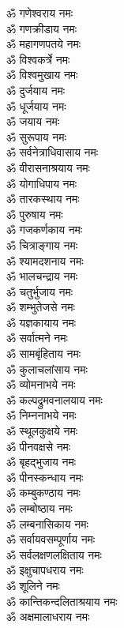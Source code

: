 \begin{multicols}{2}
\begin{flushleft}
ॐ गणेश्वराय नमः\\
ॐ गणक्रीडाय नमः\\
ॐ महागणपतये नमः\\
ॐ विश्वकर्त्रे नमः\\
ॐ विश्वमुखाय नमः\\
ॐ दुर्जयाय नमः\\
ॐ धूर्जयाय नमः\\
ॐ जयाय नमः\\
ॐ सुरूपाय नमः\\
ॐ सर्वनेत्राधिवासाय नमः\hfill{}\\
ॐ वीरासनाश्रयाय नमः\\
ॐ योगाधिपाय नमः\\
ॐ तारकस्थाय नमः\\
ॐ पुरुषाय नमः\\
ॐ गजकर्णकाय नमः\\
ॐ चित्राङ्गाय नमः\\
ॐ श्यामदशनाय नमः\\
ॐ भालचन्द्राय नमः\\
ॐ चतुर्भुजाय नमः\\
ॐ शम्भुतेजसे नमः\hfill{}\\
ॐ यज्ञकायाय नमः\\
ॐ सर्वात्मने नमः\\
ॐ सामबृंहिताय नमः\\
ॐ कुलाचलांसाय नमः\\
ॐ व्योमनाभये नमः\\
ॐ कल्पद्रुमवनालयाय नमः\\
ॐ निम्ननाभये नमः\\
ॐ स्थूलकुक्षये नमः\\
ॐ पीनवक्षसे नमः\\
ॐ बृहद्भुजाय नमः\hfill{}\\
ॐ पीनस्कन्धाय नमः\\
ॐ कम्बुकण्ठाय नमः\\
ॐ लम्बोष्ठाय नमः\\
ॐ लम्बनासिकाय नमः\\
ॐ सर्वायवसम्पूर्णाय नमः\\
ॐ सर्वलक्षणलक्षिताय नमः\\
ॐ इक्षुचापधराय नमः\\
ॐ शूलिने नमः\\
ॐ कान्तिकन्दलिताश्रयाय नमः\\
ॐ अक्षमालाधराय नमः\hfill{}\\

\end{flushleft}
\end{multicols}

